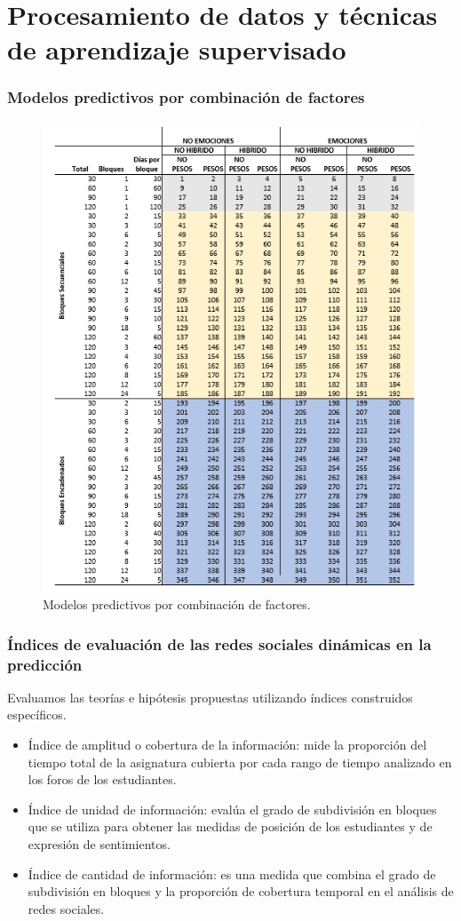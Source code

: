 \documentclass{beamer}
\begin{document}
\section{Procesamiento de datos y técnicas  de aprendizaje supervisado}
\begin{frame}
	\frametitle{Modelos predictivos por combinación de factores}
	
	\begin{figure}[H]
		\centering
		\includegraphics[width=0.5\linewidth]{figs/imagen32}
		\caption{Modelos predictivos por combinación de factores.}
		\label{fig:imagen32}
	\end{figure}
\end{frame}


\begin{frame}
	\frametitle{Índices de evaluación de las redes sociales dinámicas en la predicción}
	\begin{block}{Evaluamos las teorías e hipótesis propuestas utilizando índices construidos específicos.}
	\begin{itemize}
		\item Índice de amplitud o cobertura de la información: mide la proporción del tiempo total de la asignatura cubierta por cada rango de tiempo analizado en los foros de los estudiantes.
		\item Índice de unidad de información: evalúa el grado de subdivisión en bloques que se utiliza para obtener las medidas de posición de los estudiantes y de expresión de sentimientos.
		\item Índice de cantidad de información: es una medida que combina el grado de subdivisión en bloques y la proporción de cobertura temporal en el análisis de redes sociales.
	\end{itemize}
	\end{block}
\end{frame}
\end{document}
